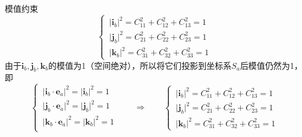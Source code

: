 \sssection[6个约束方程]
\noa[1] 模值约束
\begin{equation}
	\begin{cases}
		\,\big|\bm{i}_b\big|^2 = C_{11}^2 + C_{12}^2 + C_{13}^2 = 1\\
		\,\big|\bm{j}_b\big|^2 = C_{21}^2 + C_{22}^2 + C_{23}^2 = 1\\
		\,\big|\bm{k}_b\big|^2 = C_{31}^2 + C_{32}^2 + C_{33}^2 = 1
	\end{cases}
\end{equation}
\proof 由于$\bm{i}_b, \bm{j}_b, \bm{k}_b$的模值为1（空间绝对），所以将它们投影到坐标系$S_a$后模值仍然为1，即
\begin{equation*}
	\begin{cases}
		\,\big|\bm{i}_b \cdot \bm{e}_a\big|^2 = \big|\bm{i}_b\big|^2 = 1\\
		\,\big|\bm{j}_b \cdot \bm{e}_a\big|^2 = \big|\bm{j}_b\big|^2 = 1\\
		\,\big|\bm{k}_b \cdot \bm{e}_a\big|^2 = \big|\bm{k}_b\big|^2 = 1\\
	\end{cases}
	\qquad \Longrightarrow \qquad 
	\begin{cases}
		\,\big|\bm{i}_b\big|^2 = C_{11}^2 + C_{12}^2 + C_{13}^2 = 1\\
		\,\big|\bm{j}_b\big|^2 = C_{21}^2 + C_{22}^2 + C_{23}^2 = 1\\
		\,\big|\bm{k}_b\big|^2 = C_{31}^2 + C_{32}^2 + C_{33}^2 = 1
	\end{cases}
\end{equation*}

